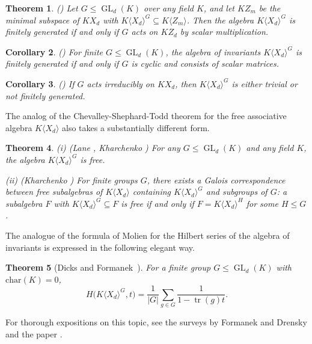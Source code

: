 \documentclass{amsart}
\newtheorem{theorem}{Theorem}[section]
\newtheorem{corollary}[theorem]{Corollary}
\theoremstyle{definition}
\DeclareMathOperator{\GL}{GL}
\DeclareMathOperator{\tr}{tr}
\newcommand{\KXd}{K\langle X_d\rangle}
\begin{document}
\begin{theorem}\label{noncommutative finite generation}{\rm(\cite{Kor})}
Let $G \leq \GL_d(K)$ over any field $K$, and let $KZ_m$ be the minimal subspace of $KX_d$ with $\KXd^G \subseteq K\langle Z_m\rangle$.
Then the algebra $\KXd^G$ is finitely generated if and only if $G$ acts on $KZ_d$ by scalar multiplication.
\end{theorem}

\begin{corollary}{(\cite{DiFo, Kh2})}
For finite $G \leq \GL_d(K)$, the algebra of invariants $\KXd^G$ is finitely generated if and only if $G$ is cyclic and consists of scalar matrices.
\end{corollary}

\begin{corollary}{\rm(\cite{Kor})}
If $G$ acts irreducibly on $KX_d$, then $\KXd^G$ is either trivial or not finitely generated.
\end{corollary}

The analog of the Chevalley-Shephard-Todd theorem for the free associative algebra $K\langle X_d\rangle$ also takes a substantially different form.

\begin{theorem}\label{free generation of noncommutative invariants}
{\rm (i) (Lane \cite{Lan}, Kharchenko \cite{Kh1})} For any $G \leq \GL_d(K)$ and any field $K$, the algebra $\KXd^G$ is free.
		
{\rm (ii) (Kharchenko \cite{Kh1})} For finite groups $G$, there exists a Galois correspondence
between free subalgebras of $\KXd$ containing $\KXd^G$ and subgroups of $G$:
a subalgebra $F$ with $\KXd^G \subseteq F$ is free if and only if $F = \KXd^H$ for some $H \leq G$.
\end{theorem}

The analogue of the formula of Molien for the Hilbert series of the algebra of invariants is expressed in the following elegant way.

\begin{theorem} [\label{noncommutatiev Molien formula}{Dicks and Formanek~{\cite{DiFo}}}]
For a finite group $G \leq \GL_d(K)$ with $\mathrm{char}(K) = 0$,
\[
H\big(K\langle X_d\rangle^G,t\big)=\frac{1}{\vert G\vert}\sum_{g\in G}\frac{1}{1-\tr(g)t}.
\]
\end{theorem}

For thorough expositions on this topic, see the surveys by Formanek \cite{Fo} and Drensky \cite{Dr1} and the paper \cite{BDDK}.
\end{document}
